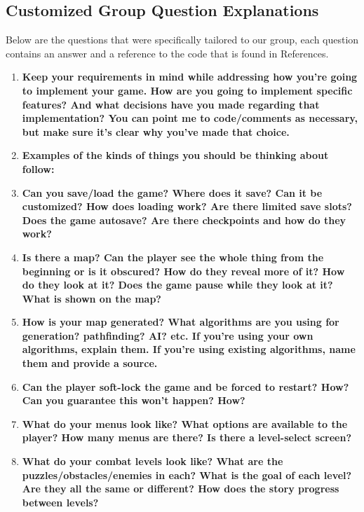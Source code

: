 \documentclass[12pt, titlepage]{article}
\begin{document}
\subsection{Customized Group Question Explanations}
\quad Below are the questions that were specifically tailored to our group, each question contains an answer and a reference to the code that is found in References.
\begin{enumerate}
	\item \textbf{Keep your requirements in mind while addressing how you're going to implement your game. How are you going to implement specific features? And what decisions have you made regarding that implementation? You can point me to code/comments as necessary, but make sure it's clear why you've made that choice.}

	\item \textbf{Examples of the kinds of things you should be thinking about follow:}

	\item \textbf{Can you save/load the game? Where does it save? Can it be customized? How does loading work? Are there limited save slots? Does the game autosave? Are there checkpoints and how do they work?}

	\item \textbf{Is there a map? Can the player see the whole thing from the beginning or is it obscured? How do they reveal more of it? How do they look at it? Does the game pause while they look at it? What is shown on the map?}

	\item \textbf{How is your map generated? What algorithms are you using for generation? pathfinding? AI? etc. If you're using your own algorithms, explain them. If you're using existing algorithms, name them and provide a source.}

	\item \textbf{Can the player soft-lock the game and be forced to restart? How? Can you guarantee this won't happen? How?}

	\item \textbf{What do your menus look like? What options are available to the player? How many menus are there? Is there a level-select screen?}

	\item \textbf{What do your combat levels look like? What are the puzzles/obstacles/enemies in each? What is the goal of each level? Are they all the same or different? How does the story progress between levels?}


\end{enumerate}
\end{document}

